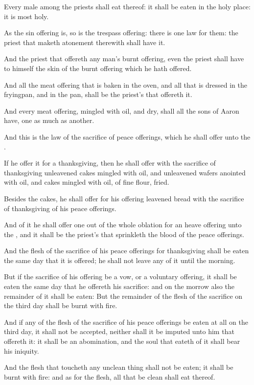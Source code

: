 \Verse Every male among the priests shall eat thereof: it shall be eaten in the holy place: it is most holy.

\Verse As the sin offering is, so is the trespass offering: there is one law for them: the priest that maketh atonement therewith shall have it.

\Verse And the priest that offereth any man's burnt offering, even the priest shall have to himself the skin of the burnt offering which he hath offered.

\Verse And all the meat offering that is baken in the oven, and all that is dressed in the fryingpan, and in the pan, shall be the priest's that offereth it.

\Verse And every meat offering, mingled with oil, and dry, shall all the sons of Aaron have, one as much as another.

\Verse And this is the law of the sacrifice of peace offerings, which he shall offer unto the \LORD.

\Verse If he offer it for a thanksgiving, then he shall offer with the sacrifice of thanksgiving unleavened cakes mingled with oil, and unleavened wafers anointed with oil, and cakes mingled with oil, of fine flour, fried.

\Verse Besides the cakes, he shall offer for his offering leavened bread with the sacrifice of thanksgiving of his peace offerings.

\Verse And of it he shall offer one out of the whole oblation for an heave offering unto the \LORD, and it shall be the priest's that sprinkleth the blood of the peace offerings.

\Verse And the flesh of the sacrifice of his peace offerings for thanksgiving shall be eaten the same day that it is offered; he shall not leave any of it until the morning.

\Verse But if the sacrifice of his offering be a vow, or a voluntary offering, it shall be eaten the same day that he offereth his sacrifice: and on the morrow also the remainder of it shall be eaten: \Verse But the remainder of the flesh of the sacrifice on the third day shall be burnt with fire.

\Verse And if any of the flesh of the sacrifice of his peace offerings be eaten at all on the third day, it shall not be accepted, neither shall it be imputed unto him that offereth it: it shall be an abomination, and the soul that eateth of it shall bear his iniquity.

\Verse And the flesh that toucheth any unclean thing shall not be eaten; it shall be burnt with fire: and as for the flesh, all that be clean shall eat thereof.

